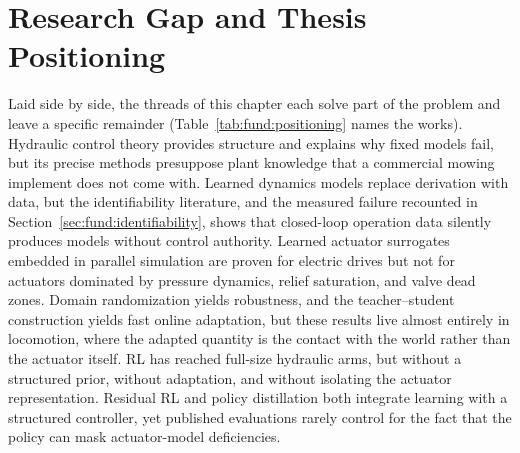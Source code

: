 \section{Research Gap and Thesis Positioning}
\label{sec:fund:gap}

Laid side by side, the threads of this chapter each solve part of the
problem and leave a specific remainder
(Table~\ref{tab:fund:positioning} names the works). Hydraulic control
theory provides structure and explains why fixed models fail, but its
precise methods presuppose plant knowledge that a commercial mowing
implement does not come with. Learned dynamics models replace
derivation with data, but the identifiability literature, and the
measured failure recounted in Section~\ref{sec:fund:identifiability},
shows that closed-loop operation data silently produces models without
control authority. Learned actuator surrogates embedded in parallel
simulation are proven for electric drives but not for actuators
dominated by pressure dynamics, relief saturation, and valve dead
zones. Domain randomization yields robustness, and the teacher--student
construction yields fast online adaptation, but these results live
almost entirely in locomotion, where the adapted quantity is the
contact with the world rather than the actuator itself. RL has reached
full-size hydraulic arms, but without a structured prior, without
adaptation, and without isolating the actuator representation.
Residual RL and policy distillation both integrate learning with a
structured controller, yet published evaluations rarely control for the
fact that the policy can mask actuator-model deficiencies.

